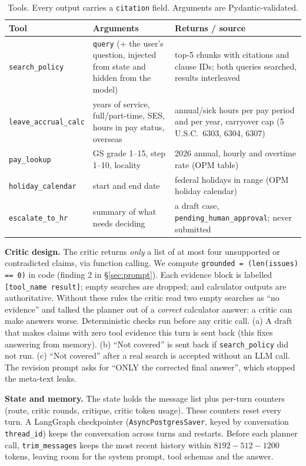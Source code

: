 \begin{table}[h]
\centering\small
\caption{Tools. Every output carries a \texttt{citation} field. Arguments are Pydantic-validated.}
\label{tab:tools}
\begin{tabularx}{\linewidth}{@{}lYY@{}}
\toprule
Tool & Arguments & Returns / source \\
\midrule
\texttt{search\_policy} & \texttt{query} (+ the user's question, injected from state and hidden from the model) &
top-5 chunks with citations and clause IDs; both queries searched, results interleaved \\
\texttt{leave\_accrual\_calc} & years of service, full/part-time, SES, hours in pay status, overseas &
annual/sick hours per pay period and per year, carryover cap (5 U.S.C.\ 6303, 6304, 6307) \\
\texttt{pay\_lookup} & GS grade 1--15, step 1--10, locality & 2026 annual, hourly and overtime rate (OPM table) \\
\texttt{holiday\_calendar} & start and end date & federal holidays in range (OPM holiday calendar) \\
\texttt{escalate\_to\_hr} & summary of what needs deciding & a draft case, \texttt{pending\_human\_approval}; never submitted \\
\bottomrule
\end{tabularx}
\end{table}

\textbf{Critic design.} The critic returns \emph{only} a list of at most four unsupported or contradicted claims,
via function calling. We compute \texttt{grounded = (len(issues) == 0)} in code (finding 2 in \S\ref{sec:prompt}).
Each evidence block is labelled \texttt{[tool\_name result]}; empty searches are dropped; and calculator outputs are
authoritative. Without these rules the critic read two empty searches as ``no evidence'' and talked the planner out
of a \emph{correct} calculator answer: a critic can make answers worse. Deterministic checks run before any critic
call. (a) A draft that makes claims with zero tool evidence this turn is sent back (this fixes answering from
memory). (b) ``Not covered'' is sent back if \texttt{search\_policy} did not run. (c) ``Not covered'' after a real
search is accepted without an LLM call. The revision prompt asks for ``ONLY the corrected final answer'', which
stopped the meta-text leaks.

\textbf{State and memory.} The state holds the message list plus per-turn counters (route, critic rounds,
critique, critic token usage). These counters reset every turn. A LangGraph checkpointer
(\texttt{AsyncPostgresSaver}, keyed by conversation \texttt{thread\_id}) keeps the conversation across turns and
restarts. Before each planner call, \texttt{trim\_messages} keeps the most recent history within
$8192 - 512 - 1200$ tokens, leaving room for the system prompt, tool schemas and the answer.

